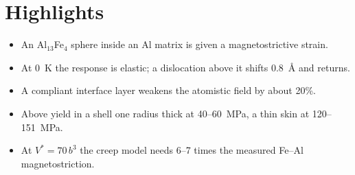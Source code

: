 \documentclass[11pt,a4paper]{article}
\begin{document}
\section*{Highlights}
\begin{itemize}
\item An Al$_{13}$Fe$_4$ sphere inside an Al matrix is given a magnetostrictive strain.
\item At 0~K the response is elastic; a dislocation above it shifts 0.8~\AA{} and returns.
\item A compliant interface layer weakens the atomistic field by about 20\%.
\item Above yield in a shell one radius thick at 40--60~MPa, a thin skin at 120--151~MPa.
\item At $V^*=70\,b^3$ the creep model needs 6--7 times the measured Fe--Al magnetostriction.
\end{itemize}
\end{document}
